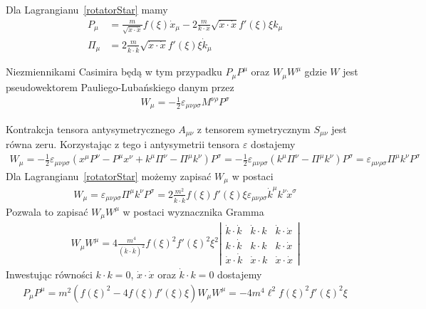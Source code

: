 Dla Lagrangianu~\ref{rotatorStar} mamy 
\begin{align*}
P_\mu &=  \frac{m}{\sqrt{ \dot{x} \cdot \dot{x} }} f(\xi) \dot{x}_\mu 
- 2 \frac{m}{k \cdot \dot{x}} \sqrt{ \dot{x} \cdot \dot{x} }
f'(\xi) \xi k_\mu  \\
\Pi_\mu &= 2 \frac{m}{\dot{k} \cdot \dot{k}} \sqrt{ \dot{x} \cdot \dot{x} }
f'(\xi) \xi \dot{k}_\mu
\end{align*}

Niezmiennikami Casimira będą w tym przypadku $P_\mu P^\mu$ oraz
$W_\mu W^\mu$ gdzie $W$ jest pseudowektorem Pauliego-Lubańskiego 
danym przez
\begin{align*}
W_\mu = - \frac{1}{2} \varepsilon_{\mu\nu\rho\sigma}
M^{\nu\rho} P^\sigma
\end{align*}

Kontrakcja tensora antysymetrycznego $A_{\mu\nu}$ z 
tensorem symetrycznym $S_{\mu\nu}$ jest równa zeru. 
Korzystając z tego i antysymetrii tensora $\varepsilon$ dostajemy
\begin{align*}
W_\mu = - \frac{1}{2} \varepsilon_{\mu\nu\rho\sigma}
(x^\mu P^\nu - P^\mu x^\nu + k^\mu \Pi^\nu - \Pi^\mu k^\nu) P^\sigma = 
 - \frac{1}{2} \varepsilon_{\mu\nu\rho\sigma}
( k^\mu \Pi^\nu - \Pi^\mu k^\nu) P^\sigma = 
  \varepsilon_{\mu\nu\rho\sigma}
 \Pi^\mu k^\nu P^\sigma
\end{align*}
Dla Lagrangianu~\ref{rotatorStar} możemy zapisać $W_\mu$ w postaci
\begin{align*}
W_\mu =  \varepsilon_{\mu\nu\rho\sigma}  \Pi^\mu k^\nu P^\sigma =
2\frac{m^2}{ \dot{k} \cdot \dot{k}} 
f(\xi) f'(\xi) \xi \varepsilon_{\mu\nu\rho\sigma} 
 \dot{k}^\mu k^\nu \dot{x}^\sigma
\end{align*}
Pozwala to zapisać $W_\mu W^\mu$ w postaci wyznacznika Gramma
\begin{align*}
W_\mu W^\mu = 
4 \frac{m^4}{ (\dot{k} \cdot \dot{k})^2} 
f(\xi)^2 f'(\xi)^2 \xi^2 
\left| 
\begin{array}{ccc}
\dot{k} \cdot \dot{k}& \dot{k} \cdot k& \dot{k} \cdot \dot{x}\\
k \cdot \dot{k}& k \cdot k &k  \cdot \dot{x}\\
\dot{x} \cdot \dot{k}& \dot{x} \cdot k &\dot{x} \cdot \dot{x}
\end{array}
\right|
\end{align*}
Inwestując równości $k\cdot k=0$, $\dot{x}\cdot\dot{x}$ 
oraz $\dot{k} \cdot k= 0$ dostajemy
\begin{align*}
P_\mu P^\mu =  m^2( f(\xi)^2- 4 f(\xi) f'(\xi) \xi)
W_\mu W^\mu = 
 - 4 m^4\ell^2  f(\xi)^2 f'(\xi)^2 \xi
\end{align*}
